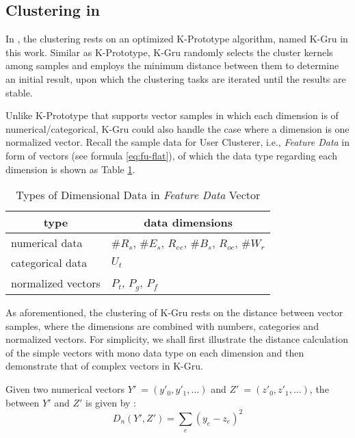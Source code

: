 \subsection{Clustering in \sys{}}
\label{sec:cluster}

In \sys{}, the clustering rests on an optimized K-Prototype  algorithm, named K-Gru in this work. 
Similar as K-Prototype, K-Gru randomly selects the cluster kernels among samples and employs the minimum distance between them to determine an initial result, upon which the clustering tasks are iterated until the results are stable.

Unlike K-Prototype that supports vector samples in which each dimension is of numerical/categorical, K-Gru could also handle the case where a dimension is one normalized vector.
%
Recall the sample data for User Clusterer, i.e., \textit{Feature Data} in form of vectors (see formula \ref{eq:fu-flat}), of which the data type regarding each dimension is shown as Table \ref{tbl:data-type}. 

\begin{table}[!htb]
\centering
\caption{Types of Dimensional Data in \textit{Feature Data} Vector}
\vspace{0.3cm}
\label{tbl:data-type}
\begin{tabular}{ll}
\toprule
\multicolumn{1}{c}{\textbf{type}} & \multicolumn{1}{c}{\textbf{data dimensions}}	\\	\midrule \midrule
numerical data				& $\#R_s$, $\#E_s$, $R_{ee}$, $\#B_s$, $R_{oc}$, $\#W_r$				\\	\midrule
categorical data			& $U_t$				\\	\midrule
normalized vectors			& $P_t$, $P_g$, $P_f$			\\ \bottomrule              
\end{tabular}
\end{table}

As aforementioned, the clustering of K-Gru rests on the distance between vector samples, where the dimensions are combined with numbers, categories and normalized vectors. 
For simplicity, we shall first illustrate the distance calculation of the simple vectors with mono data type on each dimension and then demonstrate that of complex vectors in K-Gru.

Given two numerical vectors $Y'\ = (y'_0, y'_1, ...)$ and $Z'\ = (z'_0, z'_1, ...)$, the \od{}  between $Y'$ and $Z'$ is given by :
%
\begin{equation}
\label{eq:od}
D_n(Y', Z') = \sum_{\substack{e}} (y_e - z_e)^2
\end{equation}

